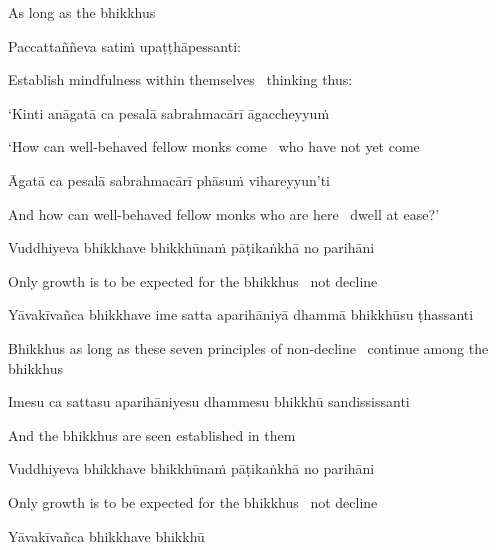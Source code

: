 \begin{cprenglish}
  As long as the bhikkhus
\end{cprenglish}

Paccattaññeva satiṁ upaṭṭhāpessanti:

\begin{cprenglish}
  Establish mindfulness within themselves \breathmark\ thinking thus:
\end{cprenglish}

‘Kinti anāgatā ca pesalā sabrahmacārī āgaccheyyuṁ

\begin{cprenglish}
  ‘How can well-behaved fellow monks come \breathmark\ who have not yet come
\end{cprenglish}

Āgatā ca pesalā sabrahmacārī phāsuṁ vihareyyun’ti

\begin{cprenglish}
  And how can well-behaved fellow monks who are here \breathmark\ dwell at ease?’
\end{cprenglish}

Vuddhiyeva bhikkhave bhikkhūnaṁ pāṭikaṅkhā no parihāni

\begin{cprenglish}
  Only growth is to be expected for the bhikkhus \breathmark\ not decline
\end{cprenglish}

Yāvakīvañca bhikkhave ime satta aparihāniyā dhammā bhikkhūsu ṭhassanti

\begin{cprenglish}
  Bhikkhus as long as these seven principles of non-decline \breathmark\ continue among the bhikkhus
\end{cprenglish}

Imesu ca sattasu aparihāniyesu dhammesu bhikkhū sandississanti

\begin{cprenglish}
  And the bhikkhus are seen established in them
\end{cprenglish}

Vuddhiyeva bhikkhave bhikkhūnaṁ pāṭikaṅkhā no parihāni

\begin{cprenglish}
  Only growth is to be expected for the bhikkhus \breathmark\ not decline
\end{cprenglish}

\suttaRef{[AN 7.23]}

Yāvakīvañca bhikkhave bhikkhū

